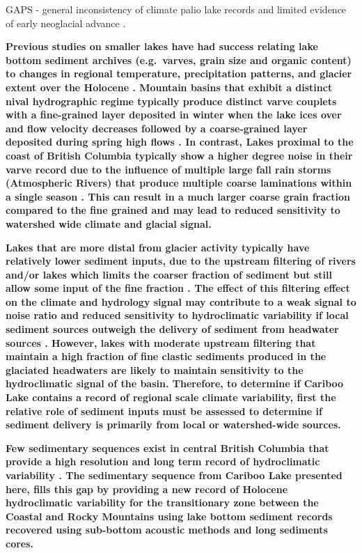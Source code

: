\documentclass[Royal,times,doublespace,sageh]{sagej}
\begin{document}
GAPS - general inconsistency of climate palio lake records and limited
evidence of early neoglacial advance \citet{Menounos2009b}.

\textbf{Previous studies on smaller lakes have had success relating lake
bottom sediment archives (e.g.~varves, grain size and organic content)
to changes in regional temperature, precipitation patterns, and glacier
extent over the Holocene
\citep{Desloges1999, Hodder2006b, Leonard1997, Menounos2006b, Menounos2008c}.
Mountain basins that exhibit a distinct nival hydrographic regime
typically produce distinct varve couplets with a fine-grained layer
deposited in winter when the lake ices over and flow velocity decreases
followed by a coarse-grained layer deposited during spring high flows
\citep[e.g.][]{Leonard1997, Hodder2007c, Desloges1999}. In contrast,
Lakes proximal to the coast of British Columbia typically show a higher
degree noise in their varve record due to the influence of multiple
large fall rain storms (Atmospheric Rivers) that produce multiple coarse
laminations within a single season
\citep[e.g.][]{Gilbert1997, Menounos2008c}. This can result in a much
larger coarse grain fraction compared to the fine grained and may lead
to reduced sensitivity to watershed wide climate and glacial signal.}

\textbf{Lakes that are more distal from glacier activity typically have
relatively lower sediment inputs, due to the upstream filtering of
rivers and/or lakes which limits the coarser fraction of sediment but
still allow some input of the fine fraction \citep{Hodder2007c}. The
effect of this filtering effect on the climate and hydrology signal may
contribute to a weak signal to noise ratio and reduced sensitivity to
hydroclimatic variability if local sediment sources outweigh the
delivery of sediment from headwater sources \citep{Jerolmack2010}.
However, lakes with moderate upstream filtering that maintain a high
fraction of fine clastic sediments produced in the glaciated headwaters
are likely to maintain sensitivity to the hydroclimatic signal of the
basin. Therefore, to determine if Cariboo Lake contains a record of
regional scale climate variability, first the relative role of sediment
inputs must be assessed to determine if sediment delivery is primarily
from local or watershed-wide sources.}

\textbf{Few sedimentary sequences exist in central British Columbia that
provide a high resolution and long term record of hydroclimatic
variability \citep{Gilbert2012, Hodder2006b}. The sedimentary sequence
from Cariboo Lake presented here, fills this gap by providing a new
record of Holocene hydroclimatic variability for the transitionary zone
between the Coastal and Rocky Mountains using lake bottom sediment
records recovered using sub-bottom acoustic methods and long sediments
cores.}
\end{document}
